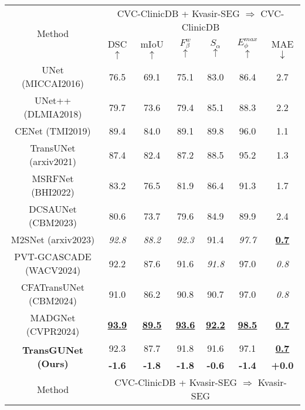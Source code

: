 \begin{table}[h]
    \centering
    \scriptsize
    \setlength\tabcolsep{2pt} %
    \renewcommand{\arraystretch}{0.75} %
    \begin{tabular}{c|cccccc}
    \hline
    \multicolumn{1}{c|}{\multirow{2}{*}{Method}} & \multicolumn{6}{c}{CVC-ClinicDB + Kvasir-SEG $\Rightarrow$ CVC-ClinicDB} \\ \cline{2-7}
     & DSC \scriptsize{$\uparrow$} & mIoU \scriptsize{$\uparrow$} & $F_{\beta}^{w}$ \scriptsize{$\uparrow$}  & $S_{\alpha}$ \scriptsize{$\uparrow$} & $E_{\phi}^{max}$ \scriptsize{$\uparrow$} & MAE \scriptsize{$\downarrow$} \\
     \hline
     UNet \tiny{(MICCAI2016)}       & 76.5 & 69.1 & 75.1 & 83.0 & 86.4 & 2.7 \\
     UNet++ \tiny{(DLMIA2018)}      & 79.7 & 73.6 & 79.4 & 85.1 & 88.3 & 2.2 \\
     CENet \tiny{(TMI2019)}         & 89.4 & 84.0 & 89.1 & 89.8 & 96.0 & 1.1 \\
     TransUNet \tiny{(arxiv2021)}   & 87.4 & 82.4 & 87.2 & 88.5 & 95.2 & 1.3 \\
     MSRFNet \tiny{(BHI2022)}       & 83.2 & 76.5 & 81.9 & 86.4 & 91.3 & 1.7 \\
     DCSAUNet \tiny{(CBM2023)}      & 80.6 & 73.7 & 79.6 & 84.9 & 89.9 & 2.4 \\
     M2SNet \tiny{(arxiv2023)}      & \textit{92.8} & \textit{88.2} & \textit{92.3} & 91.4 & \textit{97.7} & \textbf{\underline{0.7}} \\
     PVT-GCASCADE \tiny{(WACV2024)} & 92.2 & 87.6 & 91.6 & \textit{91.8} & 97.0 & \textit{0.8} \\
     CFATransUNet \tiny{(CBM2024)}  & 91.0 & 86.2 & 90.8 & 90.7 & 97.0 & \textit{0.8} \\
     MADGNet \tiny{(CVPR2024)}      & \textbf{\underline{93.9}} & \textbf{\underline{89.5}} & \textbf{\underline{93.6}} & \textbf{\underline{92.2}} & \textbf{\underline{98.5}} & \textbf{\underline{0.7}} \\
     \hline
     \multicolumn{1}{c|}{\multirow{2}{*}{\textbf{TransGUNet \tiny{(Ours)}}}}     & 92.3 & 87.7 & 91.8 & 91.6 & 97.1 & \textbf{\underline{0.7}} \\ \cline{2-7}
     & \textbf{-1.6} & \textbf{-1.8} & \textbf{-1.8} & \textbf{-0.6} & \textbf{-1.4} & \textbf{+0.0} \\
    \hline
    \multicolumn{1}{c|}{\multirow{2}{*}{Method}} & \multicolumn{6}{c}{CVC-ClinicDB + Kvasir-SEG $\Rightarrow$ Kvasir-SEG} \\ \cline{2-7}

\end{tabular}
\end{table}
